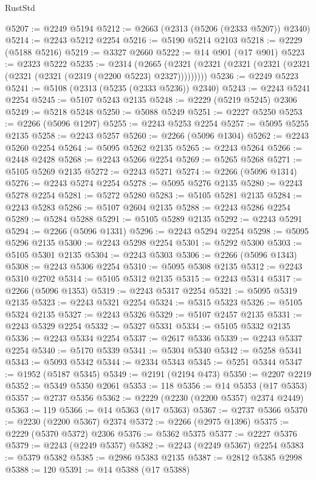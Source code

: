 \begin{lexlean}{RustStd}
\begin{coremodule}
{\begin{coremodule}
{{{{{{{{{{{{{{{{{{{{{{{{{{{{{{{{{{@5207 := @2249 @5194
@5212 := @2663 (@2313 (@5206 (@2333 @5207)) @2340)
@5214 := @2243 @5212 @2254
@5216 := @5190 @5214 @2103
@5218 := @2229 (@5188 @5216)
@5219 := @3327 @2660
@5222 := @14 @901 (@17 @901)
@5223 := @2323 @5222
@5235 := @2314
    (@2665 (@2321 (@2321 (@2321 (@2321 (@2321 (@2321 (@2321 (@2319 (@2200 @5223) @2327)))))))))
@5236 := @2249 @5223
@5241 := @5108 (@2313 (@5235 (@2333 @5236)) @2340)
@5243 := @2243 @5241 @2254
@5245 := @5107 @5243 @2135
@5248 := @2229 (@5219 @5245) @2306
@5249 := @5218 @5248
@5250 := @5088 @5249
@5251 := @2227 @5250
@5253 := @2266 (@5096 @1297)
@5255 := @2243 @5253 @2254
@5257 := @5095 @5255 @2135
@5258 := @2243 @5257
@5260 := @2266 (@5096 @1304)
@5262 := @2243 @5260 @2254
@5264 := @5095 @5262 @2135
@5265 := @2243 @5264
@5266 := @2448 @2428
@5268 := @2243 @5266 @2254
@5269 := @5265 @5268
@5271 := @5105 @5269 @2135
@5272 := @2243 @5271
@5274 := @2266 (@5096 @1314)
@5276 := @2243 @5274 @2254
@5278 := @5095 @5276 @2135
@5280 := @2243 @5278 @2254
@5281 := @5272 @5280
@5283 := @5105 @5281 @2135
@5284 := @2243 @5283
@5286 := @5107 @2604 @2135
@5288 := @2243 @5286 @2254
@5289 := @5284 @5288
@5291 := @5105 @5289 @2135
@5292 := @2243 @5291
@5294 := @2266 (@5096 @1331)
@5296 := @2243 @5294 @2254
@5298 := @5095 @5296 @2135
@5300 := @2243 @5298 @2254
@5301 := @5292 @5300
@5303 := @5105 @5301 @2135
@5304 := @2243 @5303
@5306 := @2266 (@5096 @1343)
@5308 := @2243 @5306 @2254
@5310 := @5095 @5308 @2135
@5312 := @2243 @5310 @2702
@5314 := @5105 @5312 @2135
@5315 := @2243 @5314
@5317 := @2266 (@5096 @1353)
@5319 := @2243 @5317 @2254
@5321 := @5095 @5319 @2135
@5323 := @2243 @5321 @2254
@5324 := @5315 @5323
@5326 := @5105 @5324 @2135
@5327 := @2243 @5326
@5329 := @5107 @2457 @2135
@5331 := @2243 @5329 @2254
@5332 := @5327 @5331
@5334 := @5105 @5332 @2135
@5336 := @2243 @5334 @2254
@5337 := @2617 @5336
@5339 := @2243 @5337 @2254
@5340 := @5170 @5339
@5341 := @5304 @5340
@5342 := @5258 @5341
@5343 := @5093 @5342
@5344 := @2334 @5343
@5345 := @5251 @5344
@5347 := @1952 (@5187 @5345)
@5349 := @2191 (@2194 @473)
@5350 := @2207 @2219
@5352 := @5349 @5350 @2061
@5353 := 118
@5356 := @14 @5353 (@17 @5353)
@5357 := @2737 @5356
@5362 := @2229 (@2230 (@2200 @5357) @2374 @2449)
@5363 := 119
@5366 := @14 @5363 (@17 @5363)
@5367 := @2737 @5366
@5370 := @2230 (@2200 @5367) @2374
@5372 := @2266 (@2975 @1396)
@5375 := @2229 (@5370 @5372) @2306
@5376 := @5362 @5375
@5377 := @2227 @5376
@5379 := @2243 (@2249 @5357)
@5382 := @2243 (@2249 @5367) @2254
@5383 := @5379 @5382
@5385 := @2986 @5383 @2135
@5387 := @2812 @5385 @2998
@5388 := 120
@5391 := @14 @5388 (@17 @5388)
}}}}}}}}}}}}}}}}}}}}}}}}}}}}}}}}}}
\end{coremodule}}
\end{coremodule}
\end{lexlean}

